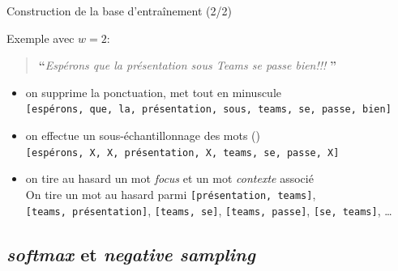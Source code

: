 \documentclass[10pt,xcolor=table,color={dvipsnames,usenames},ignorenonframetext,usepdftitle=false,french]{beamer}
\begin{document}
\begin{frame}[fragile]{Construction de la base d'entraînement (2/2)}
\protect\hypertarget{construction-de-la-base-dentrauxeenement-22}{}

Exemple avec \(w=2\):

\begin{quote}
\LARGE \textbf{``}\normalsize \emph{Espérons que la présentation sous Teams se passe bien!!!} \LARGE \textbf{''}\normalsize
\end{quote}

\begin{itemize}
\item
  on supprime la ponctuation, met tout en minuscule\\
  \faArrowCircleRight{}
  \texttt{{[}espérons,\ que,\ la,\ présentation,\ sous,\ teams,\ se,\ passe,\ bien{]}}
  \pause
\item
  on effectue un sous-échantillonnage des mots
  ()\\
  \faArrowCircleRight{}
  \texttt{{[}espérons,\ X,\ X,\ présentation,\ X,\ teams,\ se,\ passe,\ X{]}}
  \pause
\item
  on tire au hasard un mot \emph{focus} et un mot \emph{contexte}
  associé\\
  \faArrowCircleRight{} On tire un mot au hasard parmi
  \texttt{{[}présentation,\ teams{]}},
  \texttt{{[}teams,\ présentation{]}}, \texttt{{[}teams,\ se{]}},
  \texttt{{[}teams,\ passe{]}}, \texttt{{[}se,\ teams{]}}, \dots
\end{itemize}

\end{frame}

\hypertarget{softmax-et-negative-sampling}{%
\subsection{\texorpdfstring{\emph{softmax} et \emph{negative
sampling}}{softmax et negative sampling}}\label{softmax-et-negative-sampling}}
\end{document}
